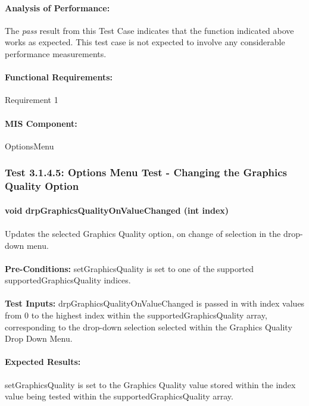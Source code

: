 \documentclass{article}
\begin{document}
    \paragraph{Analysis of Performance:} The \emph{pass} result from this Test Case indicates that the function indicated above works as expected. This test case is not expected to involve any considerable performance measurements.
    \paragraph{Functional Requirements:} Requirement 1
    \paragraph{MIS Component:} OptionsMenu
    
    \subsubsection{Test 3.1.4.5: Options Menu Test - Changing the Graphics Quality Option}
    \paragraph{}\textbf{void drpGraphicsQualityOnValueChanged (int index)}
    \paragraph{} Updates the selected Graphics Quality option, on change of selection in the drop-down menu.
    \paragraph{}\textbf{Pre-Conditions:} setGraphicsQuality is set to one of the supported supportedGraphicsQuality indices.
    \paragraph{}\textbf{Test Inputs:} drpGraphicsQualityOnValueChanged is passed in with index values from 0 to the highest index within the supportedGraphicsQuality array, corresponding to the drop-down selection selected within the Graphics Quality Drop Down Menu.
    \paragraph{Expected Results:} setGraphicsQuality is set to the Graphics Quality value stored within the index value being tested within the supportedGraphicsQuality array.
\end{document}
